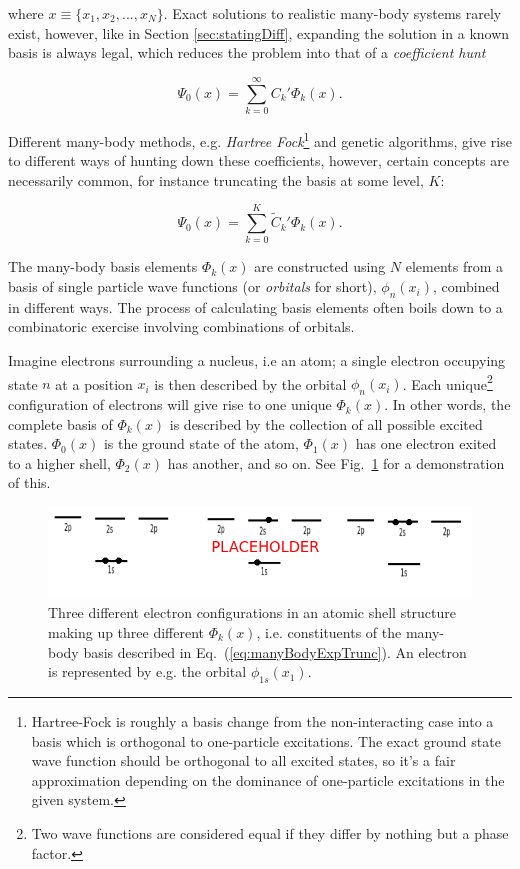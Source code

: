 where $x \equiv \{x_1, x_2, ..., x_N\}$. Exact solutions to realistic many-body systems rarely exist, however, like in Section \ref{sec:statingDiff}, expanding the solution in a known basis is always legal, which reduces the problem into that of a \textit{coefficient hunt} 

\begin{equation}
\label{eq:manyBodyExp}
 \Psi_0(x) = \sum_{k=0}^\infty C_k'\Phi_k(x).
\end{equation}

Different many-body methods, e.g. \textit{Hartree Fock}\footnote{Hartree-Fock is roughly a basis change from the non-interacting case into a basis which is orthogonal to one-particle excitations. The exact ground state wave function should be orthogonal to all excited states, so it's a fair approximation depending on the dominance of one-particle excitations in the given system.} and genetic algorithms, give rise to different ways of hunting down these coefficients, however, certain concepts are necessarily common, for instance truncating the basis at some level, $K$:

\begin{equation}
\label{eq:manyBodyExpTrunc}
 \Psi_0(x) = \sum_{k=0}^K \tilde{C}_k'\Phi_k(x).
\end{equation}

The many-body basis elements $\Phi_k(x)$ are constructed using $N$ elements from a basis of single particle wave functions (or \textit{orbitals} for short), $\phi_n(x_i)$, combined in different ways. The process of calculating basis elements often boils down to a combinatoric exercise involving combinations of orbitals.

Imagine electrons surrounding a nucleus, i.e an atom; a single electron occupying state $n$ at a position $x_i$ is then described by the orbital $\phi_n(x_i)$. Each unique\footnote{Two wave functions are considered equal if they differ by nothing but a phase factor.} configuration of electrons will give rise to one unique $\Phi_k(x)$. In other words, the complete basis of $\Phi_k(x)$ is described by the collection of all possible excited states. $\Phi_0(x)$ is the ground state of the atom, $\Phi_1(x)$ has one electron exited to a higher shell, $\Phi_2(x)$ has another, and so on. See Fig.~\ref{FIG:AtomicOrbitals} for a demonstration of this.

\begin{figure}
\label{FIG:AtomicOrbitals}
 \begin{center}
  \includegraphics[scale=0.75]{../Graphics/atomicConfigurations.png}
  \caption{Three different electron configurations in an atomic shell structure making up three different $\Phi_k(x)$, i.e. constituents of the many-body basis described in Eq.~(\ref{eq:manyBodyExpTrunc}). An electron is represented by e.g. the orbital $\phi_{1s}(x_1)$.}
 \end{center}
\end{figure}

